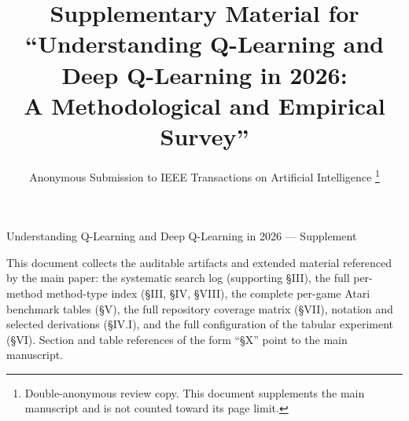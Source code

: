 \documentclass[journal]{IEEEtran}
\begin{document}
\title{Supplementary Material for\\
``Understanding Q-Learning and Deep Q-Learning in 2026:\\
A Methodological and Empirical Survey''}

\author{Anonymous Submission to IEEE Transactions on Artificial Intelligence%
\thanks{Double-anonymous review copy. This document supplements the main
manuscript and is not counted toward its page limit.}}

%
{Understanding Q-Learning and Deep Q-Learning in 2026 --- Supplement}

\maketitle

\noindent
This document collects the auditable artifacts and extended material
referenced by the main paper: the systematic search log (supporting
§III), the full per-method method-type index (§III, §IV, §VIII), the
complete per-game Atari benchmark tables (§V), the full repository
coverage matrix (§VII), notation and selected derivations (§IV.I), and
the full configuration of the tabular experiment (§VI). Section and
table references of the form ``§X'' point to the main manuscript.





\end{document}

